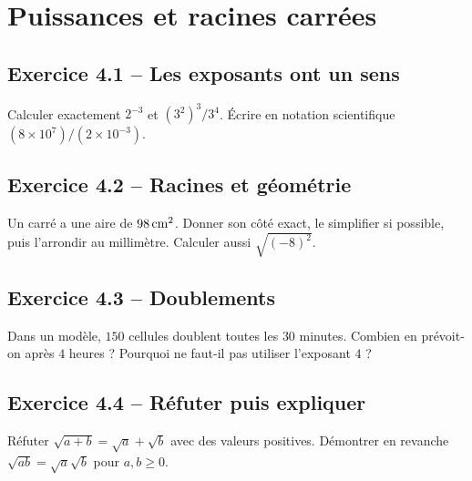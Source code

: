 \chapter{Puissances et racines carrées}
\label{exercices:04}
\section*{Exercice 4.1 -- Les exposants ont un sens}
Calculer exactement $2^{-3}$ et $(3^2)^3/3^4$. Écrire en notation scientifique $(8\times10^7)/(2\times10^{-3})$.

\section*{Exercice 4.2 -- Racines et géométrie}
Un carré a une aire de $98\,\mathrm{cm^2}$. Donner son côté exact, le simplifier si possible, puis l'arrondir au millimètre. Calculer aussi $\sqrt{(-8)^2}$.

\section*{Exercice 4.3 -- Doublements}
Dans un modèle, $150$ cellules doublent toutes les $30$ minutes. Combien en prévoit-on après $4$ heures ? Pourquoi ne faut-il pas utiliser l'exposant $4$ ?

\section*{Exercice 4.4 -- Réfuter puis expliquer}
Réfuter $\sqrt{a+b}=\sqrt a+\sqrt b$ avec des valeurs positives. Démontrer en revanche $\sqrt{ab}=\sqrt a\sqrt b$ pour $a,b\geq0$.
